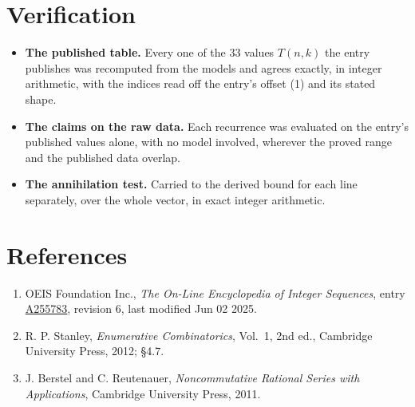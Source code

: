 \documentclass[11pt]{article}
\theoremstyle{definition}
\begin{document}
\section{Verification}

\begin{itemize}

\item {\bfseries The published table.} Every one of the 33 values $T(n,k)$ the entry publishes was recomputed from the models and agrees exactly, in integer arithmetic, with the indices read off the entry's offset (1) and its stated shape.

\item {\bfseries The claims on the raw data.} Each recurrence was evaluated on the entry's published values alone, with no model involved, wherever the proved range and the published data overlap.

\item {\bfseries The annihilation test.} Carried to the derived bound for each line separately, over the whole vector, in exact integer arithmetic.

\end{itemize}

\section{References}

\begin{enumerate}

\item OEIS Foundation Inc., \emph{The On-Line Encyclopedia of Integer Sequences}, entry \href{https://oeis.org/A255783}{A255783}, revision 6, last modified Jun 02 2025.

\item R. P. Stanley, \emph{Enumerative Combinatorics}, Vol.~1, 2nd ed., Cambridge University Press, 2012; \S4.7.

\item J. Berstel and C. Reutenauer, \emph{Noncommutative Rational Series with Applications}, Cambridge University Press, 2011.

\end{enumerate}
\end{document}
